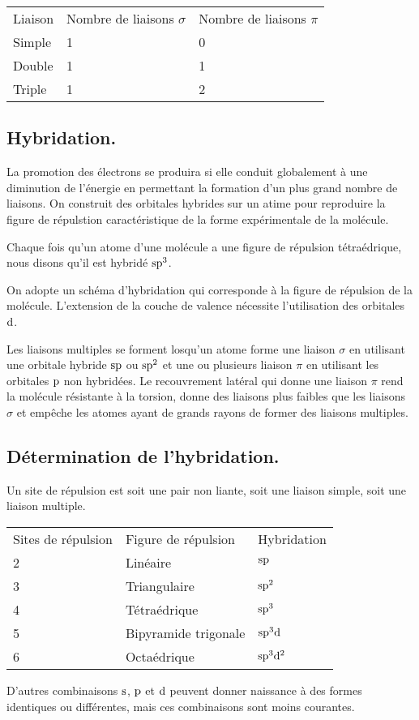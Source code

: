 \documentclass[11pt,a4paper,french]{article}
\begin{document}
\begin{tabular}{lll}
	Liaison & Nombre de liaisons $\sigma$ & Nombre de liaisons $\pi$\\
	 Simple & 1 & 0\\
	 Double & 1 & 1\\
	 Triple & 1 & 2\\
\end{tabular}

\subsection{Hybridation.}

La promotion des \'electrons se produira si elle conduit globalement \`a une diminution de l'\'energie en permettant la formation d'un plus grand nombre de liaisons. On construit des orbitales hybrides sur un atime pour reproduire la figure de r\'epulstion caract\'eristique de la forme exp\'erimentale de la mol\'ecule.

Chaque fois qu'un atome d'une mol\'ecule a une figure de r\'epulsion t\'etra\'edrique, nous disons qu'il est hybrid\'e $\mathrm{s}\mathrm{p}^3$.

On adopte un sch\'ema d'hybridation qui corresponde \`a la figure de r\'epulsion de la mol\'ecule. L'extension de la couche de valence n\'ecessite l'utilisation des orbitales $\mathrm{d}$.

Les liaisons multiples se forment losqu'un atome forme une liaison $\sigma$ en utilisant une orbitale hybride $\mathrm{s}\mathrm{p}$ ou $\mathrm{s}\mathrm{p}^2$ et une ou plusieurs liaison $\pi$ en utilisant les orbitales $\mathrm{p}$ non hybrid\'ees.
Le recouvrement lat\'eral qui donne une liaison $\pi$ rend la mol\'ecule r\'esistante \`a la torsion, donne des liaisons plus faibles que les liaisons $\sigma$ et emp\^eche les atomes ayant de grands rayons de former des liaisons multiples.

\subsection{D\'etermination de l'hybridation.}
Un site de r\'epulsion est soit une pair non liante, soit une liaison simple, soit une liaison multiple.

\begin{tabular}{lll}
	Sites de r\'epulsion & Figure de r\'epulsion & Hybridation\\
					   2 & Lin\'eaire & $\mathrm{s}\mathrm{p}$\\
					   3 & Triangulaire & $\mathrm{s}\mathrm{p}^2$\\
					   4 & T\'etra\'edrique & $\mathrm{s}\mathrm{p}^3$\\
					   5 & Bipyramide trigonale & $\mathrm{s}\mathrm{p}^3\mathrm{d}$\\
					   6 & Octa\'edrique & $\mathrm{s}\mathrm{p}^3\mathrm{d}^2$\\
\end{tabular}

D'autres combinaisons $\mathrm{s}$, $\mathrm{p}$ et $\mathrm{d}$ peuvent donner naissance \`a des formes identiques ou diff\'erentes, mais ces combinaisons sont moins courantes.
\end{document}
